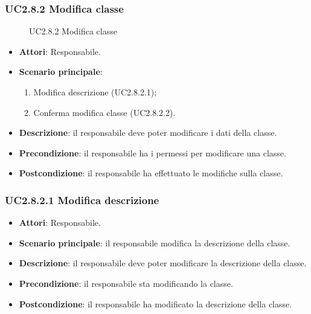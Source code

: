 \subsubsection{UC2.8.2 Modifica classe}
\begin{figure}[H]
\centering
\noindent{}
\caption{UC2.8.2 Modifica classe}
\end{figure}
\begin{itemize}
\item \textbf{Attori}: Responsabile.
\item \textbf{Scenario principale}:
\begin{enumerate}
\item Modifica descrizione (UC2.8.2.1);
\item Conferma modifica classe (UC2.8.2.2).
\end{enumerate}
\item \textbf{Descrizione}: il responsabile deve poter modificare i dati della classe.
\item \textbf{Precondizione}: il responsabile ha i permessi per modificare una classe.
\item \textbf{Postcondizione}: il responsabile ha effettuato le modifiche sulla classe.
\end{itemize}
\subsubsection{UC2.8.2.1 Modifica descrizione}
\begin{itemize}
\item \textbf{Attori}: Responsabile.
\item \textbf{Scenario principale}: il responsabile modifica la descrizione della classe.
\item \textbf{Descrizione}: il responsabile deve poter modificare la descrizione della classe.
\item \textbf{Precondizione}: il responsabile sta modificando la classe.
\item \textbf{Postcondizione}: il responsabile ha modificato la descrizione della classe.
\end{itemize}
